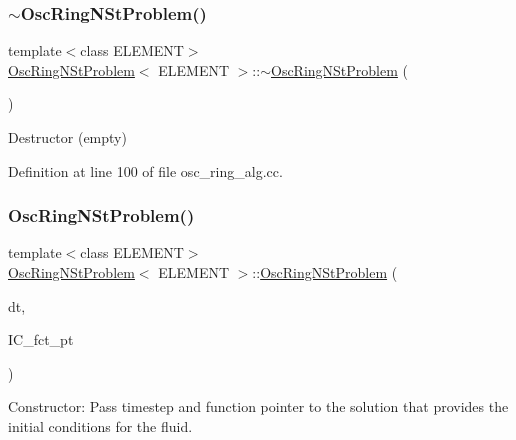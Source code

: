 \subsubsection{\texorpdfstring{$\sim$\+Osc\+Ring\+N\+St\+Problem()}{~OscRingNStProblem()}\hspace{0.1cm}{\footnotesize\ttfamily [1/2]}}
{\footnotesize\ttfamily template$<$class E\+L\+E\+M\+E\+NT$>$ \\
\hyperlink{classOscRingNStProblem}{Osc\+Ring\+N\+St\+Problem}$<$ E\+L\+E\+M\+E\+NT $>$\+::$\sim$\hyperlink{classOscRingNStProblem}{Osc\+Ring\+N\+St\+Problem} (\begin{DoxyParamCaption}{ }\end{DoxyParamCaption})\hspace{0.3cm}{\ttfamily [inline]}}



Destructor (empty) 



Definition at line 100 of file osc\+\_\+ring\+\_\+alg.\+cc.

\mbox{\label{classOscRingNStProblem_acd5f633c43eb4cfb43c45361ecf85e6b}} 
\subsubsection{\texorpdfstring{Osc\+Ring\+N\+St\+Problem()}{OscRingNStProblem()}\hspace{0.1cm}{\footnotesize\ttfamily [2/2]}}
{\footnotesize\ttfamily template$<$class E\+L\+E\+M\+E\+NT$>$ \\
\hyperlink{classOscRingNStProblem}{Osc\+Ring\+N\+St\+Problem}$<$ E\+L\+E\+M\+E\+NT $>$\+::\hyperlink{classOscRingNStProblem}{Osc\+Ring\+N\+St\+Problem} (\begin{DoxyParamCaption}\item[{const double \&}]{dt,  }\item[{Finite\+Element\+::\+Unsteady\+Exact\+Solution\+Fct\+Pt}]{I\+C\+\_\+fct\+\_\+pt }\end{DoxyParamCaption})}



Constructor\+: Pass timestep and function pointer to the solution that provides the initial conditions for the fluid. 

